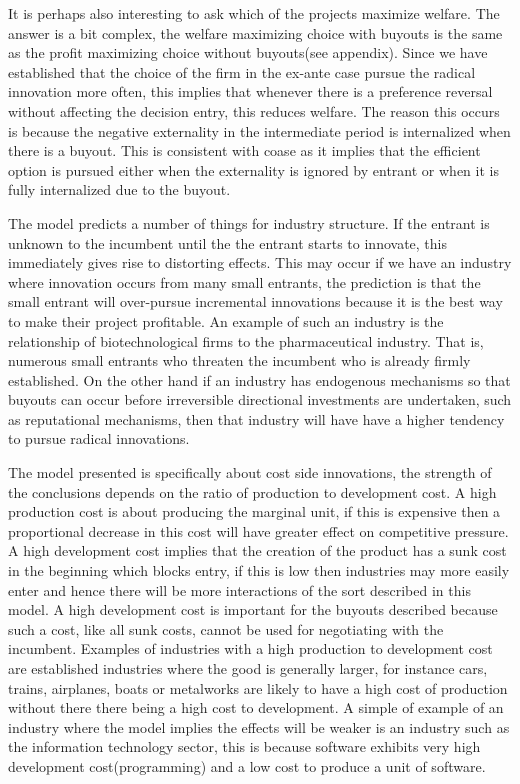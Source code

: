 \documentclass[11pt]{article}
\begin{document}
It is perhaps also interesting to ask which of the projects maximize welfare. The answer is a bit complex, the welfare maximizing choice with buyouts is the same as the profit maximizing choice without buyouts(see appendix). Since we have established that the choice of the firm in the ex-ante case pursue the radical innovation more often, this implies that whenever there is a preference reversal without affecting the decision entry, this reduces welfare. The reason this occurs is because the negative externality in the intermediate period is internalized when there is a buyout. This is consistent with coase as it implies that the efficient option is pursued either when the externality is ignored by entrant or when it is fully internalized due to the buyout.

The model predicts a number of things for industry structure. If the entrant is unknown to the incumbent until the the entrant starts to innovate, this immediately gives rise to distorting effects.  This may occur if we have an industry where innovation occurs from many small entrants, the prediction is that the small entrant will over-pursue incremental innovations because it is the best way to make their project profitable. An example of such an industry is the relationship of biotechnological firms to the pharmaceutical industry. That is, numerous small entrants who threaten the incumbent who is already firmly established. On the other hand if an industry has endogenous mechanisms so that buyouts can occur before irreversible directional investments are undertaken, such as reputational mechanisms, then that industry will have have a higher tendency to pursue radical innovations. 

The model presented is specifically about cost side innovations, the strength of the conclusions depends on the ratio of production to development cost. A high production cost is about producing the marginal unit, if this is expensive then a proportional decrease in this cost will have greater effect on competitive pressure. A high development cost implies that the creation of the product has a sunk cost in the beginning which blocks entry, if this is low then industries may more easily enter and hence there will be more interactions of the sort described in this model. A high development cost is important for the buyouts described because such a cost, like all sunk costs, cannot be used for negotiating with the incumbent. Examples of industries with a high production to development cost are established industries where the good is generally larger, for instance cars, trains, airplanes, boats or metalworks are likely to have a high cost of production without there there being a high cost to development. A simple of example of an industry where the model implies the effects will be weaker is an industry such as the information technology sector, this is because software exhibits very high development cost(programming) and a low cost to produce a unit of software.  
\end{document}
